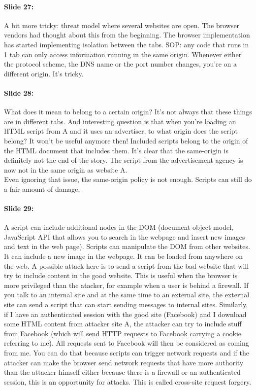 \documentclass[10pt,a4paper]{report}
\begin{document}
\paragraph{Slide 27:} A bit more tricky: threat model where several websites are open. The browser vendors had thought about this from the beginning. The browser implementation has started implementing isolation between the tabs. SOP: any code that runs in 1 tab can only access information running in the same origin. Whenever either the protocol scheme, the DNS name or the port number changes, you're on a different origin. It's tricky. 

\paragraph{Slide 28:} What does it mean to belong to a certain origin? It's not always that these things are in different tabs. And interesting question is that when you're loading an HTML script from A and it uses an advertiser, to what origin does the script belong? It won't be useful anymore then! Included scripts belong to the origin of the HTML document that includes them. It's clear that the same-origin is definitely not the end of the story. The script from the advertisement agency is now not in the same origin as website A.\\
Even ignoring that issue, the same-origin policy is not enough. Scripts can still do a fair amount of damage.

\paragraph{Slide 29:} A script can include additional nodes in the DOM (document object model, JavaScript API that allows you to search in the webpage and insert new images and text in the web page). Scripts can manipulate the DOM from other websites. It can include a new image in the webpage. It can be loaded from anywhere on the web. A possible attack here is to send a script from the bad website that will try to include content in the good website. This is useful when the browser is more privileged than the atacker, for example when a user is behind a firewall. If you talk to an internal site and at the same time to an external site, the external site can send a script that can start sending messages to internal sites. Similarly, if I have an authenticated session with the good site (Facebook) and I download some HTML content from attacker site A, the attacker can try to include stuff from Facebook (which will send HTTP requests to Facebook carrying a cookie referring to me). All requests sent to Facebook will then be considered as coming from me. You can do that because scripts can trigger network requests and if the attacker can make the browser send network requests that have more authority than the attacker himself either because there is a firewall or an authenticated session, this is an opportunity for attacks. This is called cross-site request forgery.
\end{document}
